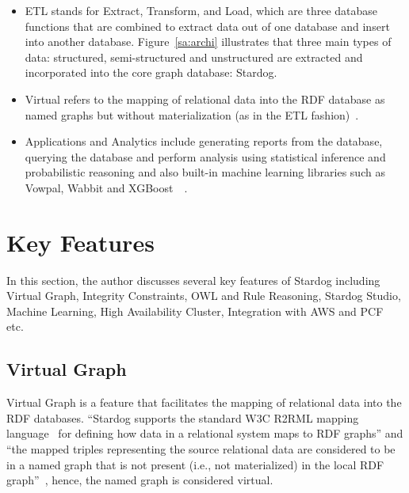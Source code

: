 \begin{itemize}
	\item ETL stands for Extract, Transform, and Load, which are three 
	database functions that are combined to extract data out of one database 
	and insert into another database. Figure~\ref{sa:archi} illustrates that 
	three main types of data: structured, semi-structured and unstructured 
	are extracted and incorporated into the core graph database: Stardog. 
	\item Virtual refers to the mapping of relational data into the RDF database 
	as named graphs but without materialization (as in the ETL 
	fashion)~\cite{hid-sp18-405-blog-stardog-virtual}. 
	\item Applications and Analytics include generating reports from the 
	database, querying the database and perform analysis using statistical 
	inference and probabilistic reasoning and also built-in 
	machine learning libraries such as Vowpal, Wabbit and 
	XGBoost~\cite{hid-sp18-405-blog-stardog-ml}~\cite{hid-sp18-405-blog-stardog-xgboost}.
\end{itemize}

\section{Key Features}
In this section, the author discusses several key features of Stardog 
including Virtual Graph, Integrity Constraints, OWL and Rule 
Reasoning, Stardog Studio, Machine Learning, 
High Availability Cluster, Integration with AWS and PCF etc.\

\subsection{Virtual Graph}
Virtual Graph is a feature that facilitates the mapping of relational data into 
the RDF databases. ``Stardog supports the standard W3C R2RML mapping 
language~\cite{hid-sp18-405-www-stardog-r2rml} for defining how data in a 
relational system maps to RDF graphs'' and ``the mapped triples 
representing the source relational data are considered to be in a named 
graph that is not present (i.e., not materialized) in the local RDF 
graph''~\cite{hid-sp18-405-blog-stardog-virtual}, hence, the named graph is 
considered virtual.

